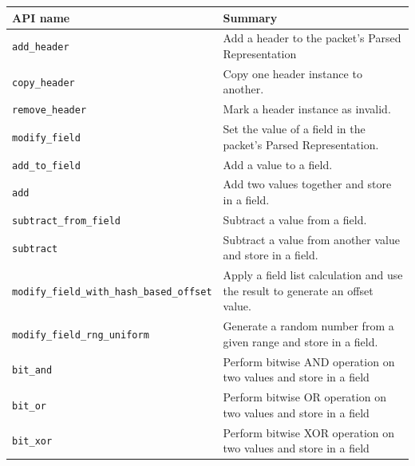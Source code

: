 \documentclass[12pt]{article}
\begin{document}
\begin{table}[H]
\begin{center}
\begin{tabular}{| l | p{} |} \hline
\textbf{API name} &
\textbf{Summary} \\ \hline
\texttt{add_header} &
Add a header to the packet's Parsed Representation \\ \hline
\texttt{copy_header} &
Copy one header instance to another. \\ \hline
\texttt{remove_header} &
Mark a header instance as invalid. \\ \hline
\texttt{modify_field} &
Set the value of a field in the packet's Parsed Representation. \\ \hline
\texttt{add_to_field} &
Add a value to a field. \\ \hline
\texttt{add} &
Add two values together and store in a field. \\ \hline
\texttt{\color{red}subtract_from_field} &
Subtract a value from a field. \\ \hline
\texttt{\color{red}subtract} &
Subtract a value from another value and store in a field. \\ \hline
\texttt{\color{red}modify_field_with_hash_based_offset} &
Apply a field list calculation and use the result to generate an offset value. \\ \hline
\texttt{\color{red}modify_field_rng_uniform} &
Generate a random number from a given range and store in a field. \\ \hline
\texttt{\color{red}bit_and} &
Perform bitwise AND operation on two values and store in a field  \\ \hline
\texttt{\color{red}bit_or} &
Perform bitwise OR operation on two values and store in a field  \\ \hline
\texttt{\color{red}bit_xor} &
Perform bitwise XOR operation on two values and store in a field  \\ \hline
\end{tabular}
\end{center}
\end{table}
\end{document}
